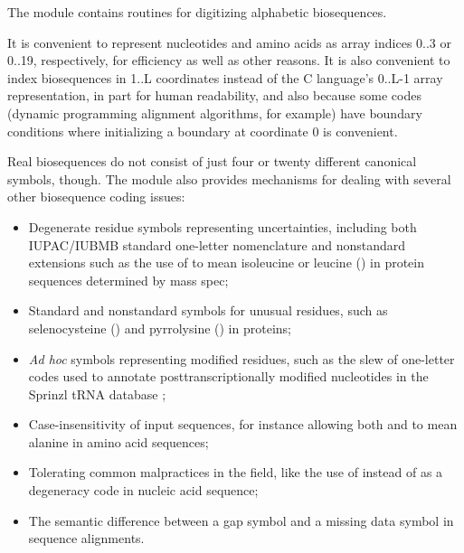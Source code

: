 The  module contains routines for digitizing
alphabetic biosequences.

It is convenient to represent nucleotides and amino acids as array
indices 0..3 or 0..19, respectively, for efficiency as well as other
reasons. It is also convenient to index biosequences in 1..L
coordinates instead of the C language's 0..L-1 array representation,
in part for human readability, and also because some codes (dynamic
programming alignment algorithms, for example) have boundary
conditions where initializing a boundary at coordinate 0 is
convenient.

Real biosequences do not consist of just four or twenty different
canonical symbols, though. The  module also provides
mechanisms for dealing with several other biosequence coding issues:

\begin{itemize}
  \item Degenerate residue symbols representing uncertainties,
        including both IUPAC/IUBMB standard one-letter nomenclature
        and nonstandard extensions such as the use of  to
        mean isoleucine or leucine () in protein sequences
        determined by mass spec;

  \item Standard and nonstandard symbols for unusual residues, such as
        selenocysteine () and pyrrolysine () in
        proteins;

  \item \emph{Ad hoc} symbols representing modified residues, such as
        the slew of one-letter codes used to annotate
        posttranscriptionally modified nucleotides in the Sprinzl tRNA
        database \citep{Sprinzl98};

  \item Case-insensitivity of input sequences, for instance allowing
        both  and  to mean alanine in amino acid
        sequences;

  \item Tolerating common malpractices in the field, like the use of
        instead of  as a degeneracy code in nucleic
       acid sequence;

  \item The semantic difference between a gap symbol and a missing
        data symbol in sequence alignments.
\end{itemize}        


